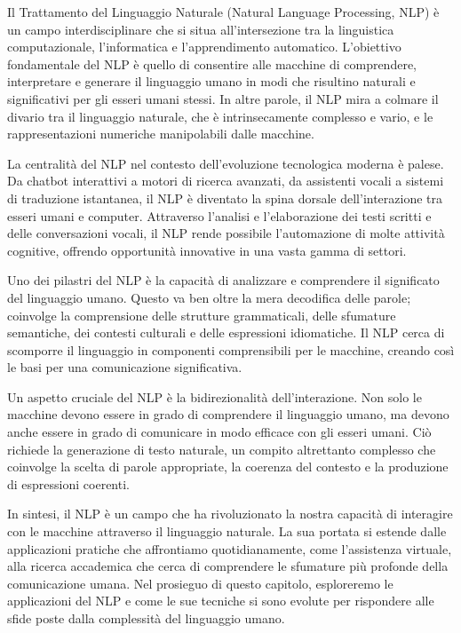 Il Trattamento del Linguaggio Naturale (Natural Language Processing, NLP) è un campo interdisciplinare che si situa all'intersezione tra la linguistica computazionale, l'informatica e l'apprendimento automatico. L'obiettivo fondamentale del NLP è quello di consentire alle macchine di comprendere, interpretare e generare il linguaggio umano in modi che risultino naturali e significativi per gli esseri umani stessi. In altre parole, il NLP mira a colmare il divario tra il linguaggio naturale, che è intrinsecamente complesso e vario, e le rappresentazioni numeriche manipolabili dalle macchine.

La centralità del NLP nel contesto dell'evoluzione tecnologica moderna è palese. Da chatbot interattivi a motori di ricerca avanzati, da assistenti vocali a sistemi di traduzione istantanea, il NLP è diventato la spina dorsale dell'interazione tra esseri umani e computer. Attraverso l'analisi e l'elaborazione dei testi scritti e delle conversazioni vocali, il NLP rende possibile l'automazione di molte attività cognitive, offrendo opportunità innovative in una vasta gamma di settori.

Uno dei pilastri del NLP è la capacità di analizzare e comprendere il significato del linguaggio umano. Questo va ben oltre la mera decodifica delle parole; coinvolge la comprensione delle strutture grammaticali, delle sfumature semantiche, dei contesti culturali e delle espressioni idiomatiche. Il NLP cerca di scomporre il linguaggio in componenti comprensibili per le macchine, creando così le basi per una comunicazione significativa.

Un aspetto cruciale del NLP è la bidirezionalità dell'interazione. Non solo le macchine devono essere in grado di comprendere il linguaggio umano, ma devono anche essere in grado di comunicare in modo efficace con gli esseri umani. Ciò richiede la generazione di testo naturale, un compito altrettanto complesso che coinvolge la scelta di parole appropriate, la coerenza del contesto e la produzione di espressioni coerenti.

In sintesi, il NLP è un campo che ha rivoluzionato la nostra capacità di interagire con le macchine attraverso il linguaggio naturale. La sua portata si estende dalle applicazioni pratiche che affrontiamo quotidianamente, come l'assistenza virtuale, alla ricerca accademica che cerca di comprendere le sfumature più profonde della comunicazione umana. Nel prosieguo di questo capitolo, esploreremo le applicazioni del NLP e come le sue tecniche si sono evolute per rispondere alle sfide poste dalla complessità del linguaggio umano.

